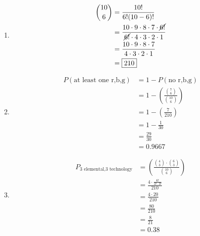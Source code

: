 \documentclass[a4paper, 10pt]{article}
\begin{document}
            \begin{enumerate}[label=(\alph*)]
                \item
                \[
                    \begin{aligned}
                        \binom{10}{6} &= \frac{10!}{6!(10-6)!} \\
                        &= \frac{10 \cdot 9 \cdot 8 \cdot 7 \cdot \cancel{6!}}{\cancel{6!} \cdot 4 \cdot 3 \cdot 2 \cdot 1} \\
                        &= \frac{10 \cdot 9 \cdot 8 \cdot 7}{4 \cdot 3 \cdot 2 \cdot 1} \\
                        &= \boxed{210}
                    \end{aligned}
                \]

                \item
                \[
                    \begin{aligned}
                        P(\text{at least one r,b,g}) &= 1 - P(\text{no r,b,g}) \\
                        &= 1 - \left( \frac{\binom{7}{6}}{\binom{10}{6}} \right) \\
                        &= 1 - \left( \frac{7}{210} \right) \\
                        &= 1 - \frac{1}{30} \\
                        &= \frac{29}{30} \\
                        &= \boxed{0.9667}
                    \end{aligned}
                \]

                \item
                \[
                    \begin{aligned}
                        P_{3 \text{ elemental,3 technology}} &= \left( \frac{\binom{4}{3} \cdot \binom{6}{3}}{\binom{10}{6}} \right) \\
                        &= \frac{4 \cdot \frac{6!}{3! \cdot 3!}}{210} \\
                        &= \frac{4 \cdot 20}{210} \\
                        &= \frac{80}{210} \\
                        &= \frac{8}{21} \\
                        &= \boxed{0.38}
                    \end{aligned}
                \]


\end{enumerate}
\end{document}
